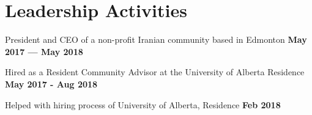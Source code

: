 \documentclass[letter,11pt]{article}
\begin{document}








\section{Leadership Activities}
\begin{zitemize}
	\item President and CEO of a non-profit Iranian community based in Edmonton \hfill \textbf{May 2017 --- May 2018}
	\item Hired as a Resident Community Advisor at the University of Alberta Residence \hfill \textbf{May 2017 - Aug 2018}
	\item Helped with hiring process of University of Alberta, Residence \hfill \textbf{Feb 2018}
\end{zitemize}
\end{document}
